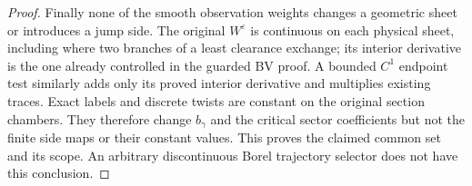 \begin{proof}
Finally none of the smooth observation weights changes a
geometric sheet or introduces a jump side. The original
$W^\varepsilon$ is continuous on each physical sheet,
including where two branches of a least clearance exchange;
its interior derivative is the one already controlled in
the guarded BV proof. A bounded $C^1$ endpoint test similarly
adds only its proved interior derivative and multiplies
existing traces. Exact labels and discrete twists are constant
on the original section chambers. They therefore change
$b_\gamma$ and the critical sector coefficients but not the
finite side maps or their constant values. This proves the
claimed common set and its scope. An arbitrary discontinuous
Borel trajectory selector does not have this conclusion.
\end{proof}


